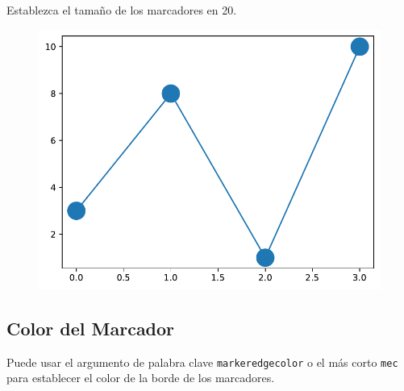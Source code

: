 \begin{code} Establezca el tamaño de los marcadores en 20.

\begin{Shaded}
\begin{Highlighting}[]

\OperatorTok{=}\NormalTok{ np.array([}\NormalTok{, }\NormalTok{, }\NormalTok{, }\NormalTok{])}

\OperatorTok{=} \OperatorTok{=} \NormalTok{)}
\end{Highlighting}
\end{Shaded}

\begin{figure}
  \centering
  \includegraphics[scale=0.6]{img/grafica1011.pdf}
\end{figure}

\end{code}

\subsection{Color del Marcador}

Puede usar el argumento de palabra clave \texttt{markeredgecolor} o el
más corto \texttt{mec} para establecer el color de la borde de los
marcadores.\\

